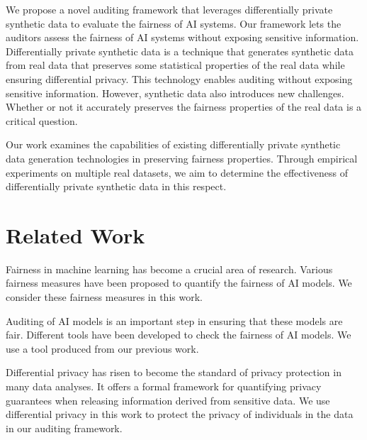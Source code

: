 \documentclass[manuscript,screen,review,anonymous]{acmart}
\begin{document}

We propose a novel auditing framework that leverages differentially private synthetic data to evaluate the fairness of AI systems. Our framework lets the auditors assess the fairness of AI systems without exposing sensitive information. Differentially private synthetic data is a technique that generates synthetic data from real data that preserves some statistical properties of the real data while ensuring differential privacy. This technology enables auditing without exposing sensitive information. However, synthetic data also introduces new challenges. Whether or not it accurately preserves the fairness properties of the real data is a critical question.


Our work examines the capabilities of existing differentially private synthetic data generation technologies in preserving fairness properties. Through empirical experiments on multiple real datasets, we aim to determine the effectiveness of differentially private synthetic data in this respect.

\section{Related Work}


Fairness in machine learning has become a crucial area of research\cite{barocas2023fairness}. Various fairness measures have been proposed to quantify\cite{yeh2024analyzing} the fairness of AI models\cite{pessach2022review,corbett2017algorithmic,vzliobaite2017measuring,hardt2016equality,corbett2017algorithmic,berk2021fairness,chouldechova2017fair,kleinberg2016inherent}. We consider these fairness measures in this work.

Auditing of AI models is an important step in ensuring that these models are fair\cite{ferrara2023fairness}. Different tools have been developed to check the fairness of AI models\cite{saleiro2018aequitas,bellamy2019ai,bird2020fairlearn}. We use a tool produced from our previous work\cite{yuan2024ensuring}.


Differential privacy has risen to become the standard of privacy protection in many data analyses\cite{jiang2021applications}. It offers a formal framework for quantifying privacy guarantees when releasing information derived from sensitive data\cite{dwork2006calibrating,dwork2014algorithmic}. We use differential privacy in this work to protect the privacy of individuals in the data in our auditing framework.
\end{document}
